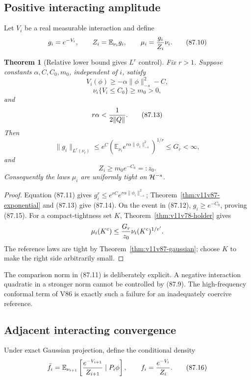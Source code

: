 \documentclass[11pt]{article}
\newtheorem{theorem}{Theorem}[section]
\begin{document}
\subsection{Positive interacting amplitude}

Let \(V_i\) be a real measurable interaction and define
\[
 g_i=e^{-V_i},\qquad
 Z_i=\mathbb E_{\nu_i}g_i,\qquad
 \mu_i={g_i\over Z_i}\nu_i.                                 \tag{87.10}
\]

\begin{theorem}[Relative lower bound gives \(L^r\) control]
\label{thm:v11v87-relative}
Fix \(r>1\).  Suppose constants \(\alpha,C,C_0,m_0\), independent of
\(i\), satisfy
\[
 V_i(\phi)\ge-\alpha\|\phi\|_{-s}^2-C,                       \tag{87.11}
\]
\[
 \nu_i\{V_i\le C_0\}\ge m_0>0,                              \tag{87.12}
\]
and
\[
                                      r\alpha<{1\over2\|Q\|}.\tag{87.13}
\]
Then
\[
 \|g_i\|_{L^r(\nu_i)}
 \le e^C
 \left(\mathbb E_{\nu_i}
       e^{r\alpha\|\phi_i\|_{-s}^2}\right)^{1/r}
 \le G_r<\infty,                                            \tag{87.14}
\]
and
\[
                                      Z_i\ge m_0e^{-C_0}=:z_0.
                                                                    \tag{87.15}
\]
Consequently the laws \(\mu_i\) are uniformly tight on
\({\cal H}^{-s}\).
\end{theorem}

\begin{proof}
Equation (87.11) gives
\(g_i^r\le e^{rC}e^{r\alpha\|\phi_i\|_{-s}^2}\);
Theorem~\ref{thm:v11v87-exponential} and (87.13) give (87.14).
On the event in (87.12), \(g_i\ge e^{-C_0}\), proving (87.15).
For a compact-tightness set \(K\), Theorem~\ref{thm:v11v78-holder}
gives
\[
 \mu_i(K^c)\le {G_r\over z_0}\nu_i(K^c)^{1/r'}.
\]
The reference laws are tight by
Theorem~\ref{thm:v11v87-gaussian}; choose \(K\) to make the right side
arbitrarily small.
\end{proof}

The comparison norm in (87.11) is deliberately explicit.  A negative
interaction quadratic in a stronger norm cannot be controlled by
(87.9).  The high-frequency conformal term of V86 is exactly such a
failure for an inadequately coercive reference.

\subsection{Adjacent interacting convergence}

Under exact Gaussian projection, define the conditional density
\[
 \bar f_i
 =\mathbb E_{\nu_{i+1}}
       \left[{e^{-V_{i+1}}\over Z_{i+1}}\mid P_i\phi\right],
 \qquad
 f_i={e^{-V_i}\over Z_i}.                                   \tag{87.16}
\]
\end{document}

